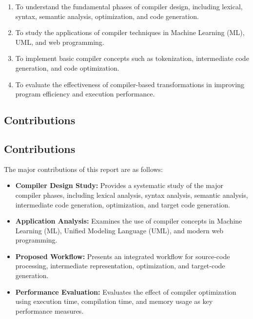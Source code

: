 \documentclass[12pt,a4paper]{article}
\begin{document}
\begin{enumerate}
    \item To understand the fundamental phases of compiler design, including
    lexical, syntax, semantic analysis, optimization, and code generation.

    \item To study the applications of compiler techniques in
    Machine Learning (ML), UML, and web programming.

    \item To implement basic compiler concepts such as tokenization,
    intermediate code generation, and code optimization.

    \item To evaluate the effectiveness of compiler-based transformations
    in improving program efficiency and execution performance.
\end{enumerate}

\subsection{Contributions}

\subsection{Contributions}

The major contributions of this report are as follows:

\begin{itemize}
    \item \textbf{Compiler Design Study:}
    Provides a systematic study of the major compiler phases, including
    lexical analysis, syntax analysis, semantic analysis, intermediate code
    generation, optimization, and target code generation.

    \item \textbf{Application Analysis:}
    Examines the use of compiler concepts in Machine Learning (ML),
    Unified Modeling Language (UML), and modern web programming.

    \item \textbf{Proposed Workflow:}
    Presents an integrated workflow for source-code processing, intermediate
    representation, optimization, and target-code generation.

    \item \textbf{Performance Evaluation:}
    Evaluates the effect of compiler optimization using execution time,
    compilation time, and memory usage as key performance measures.
\end{itemize}
\end{document}
